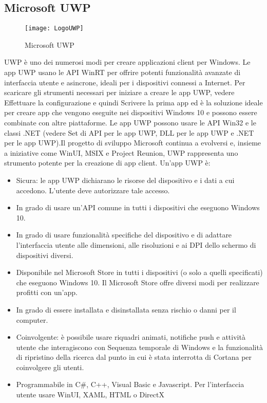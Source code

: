 \subsection{Microsoft UWP}
\begin{figure}[htpb!]
\center
  \texttt{[image: LogoUWP]}
  \caption{Microsoft UWP}
\end{figure}
UWP è uno dei numerosi modi per creare applicazioni client per Windows. Le app UWP usano le API WinRT per offrire potenti funzionalità avanzate di interfaccia utente e asincrone, ideali per i dispositivi connessi a Internet.
Per scaricare gli strumenti necessari per iniziare a creare le app UWP, vedere Effettuare la configurazione e quindi Scrivere la prima app ed è la soluzione ideale per creare app che vengono eseguite nei dispositivi Windows 10 e possono essere combinate con altre piattaforme. Le app UWP possono usare le API Win32 e le classi .NET (vedere Set di API per le app UWP, DLL per le app UWP e .NET per le app UWP).Il progetto di sviluppo Microsoft continua a evolversi e, insieme a iniziative come WinUI, MSIX e Project Reunion, UWP rappresenta uno strumento potente per la creazione di app client.
Un'app UWP è:
\begin{itemize}
\item Sicura: le app UWP dichiarano le risorse del dispositivo e i dati a cui accedono. L'utente deve autorizzare tale accesso.
\item In grado di usare un'API comune in tutti i dispositivi che eseguono Windows 10.
\item In grado di usare funzionalità specifiche del dispositivo e di adattare l'interfaccia utente alle dimensioni, alle risoluzioni e ai DPI dello schermo di dispositivi diversi.
\item Disponibile nel Microsoft Store in tutti i dispositivi (o solo a quelli specificati) che eseguono Windows 10. Il Microsoft Store offre diversi modi per realizzare profitti con un'app.
\item In grado di essere installata e disinstallata senza rischio o danni per il computer.
\item Coinvolgente: è possibile usare riquadri animati, notifiche push e attività utente che interagiscono con Sequenza temporale di Windows e la funzionalità di ripristino della ricerca dal punto in cui è stata interrotta di Cortana per coinvolgere gli utenti.
\item Programmabile in C\#, C++, Visual Basic e Javascript. Per l'interfaccia utente usare WinUI, XAML, HTML o DirectX
\end{itemize}
